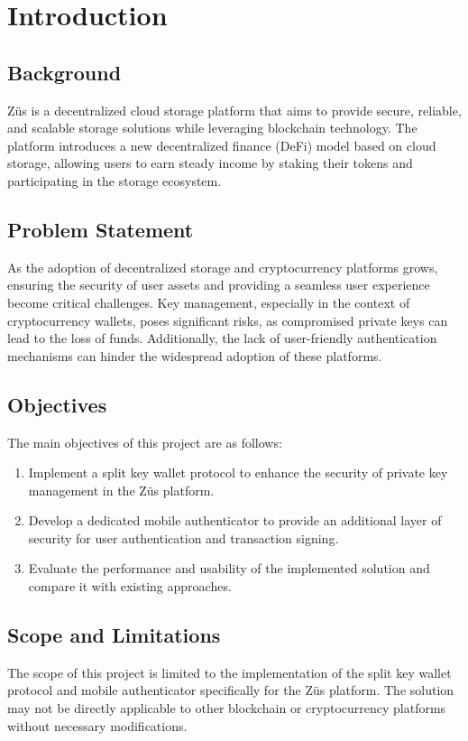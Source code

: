 \chapter{Introduction}

\section{Background}
Züs is a decentralized cloud storage platform that aims to provide secure, reliable, and scalable storage solutions while leveraging blockchain technology. The platform introduces a new decentralized finance (DeFi) model based on cloud storage, allowing users to earn steady income by staking their tokens and participating in the storage ecosystem.

\section{Problem Statement}
As the adoption of decentralized storage and cryptocurrency platforms grows, ensuring the security of user assets and providing a seamless user experience become critical challenges. Key management, especially in the context of cryptocurrency wallets, poses significant risks, as compromised private keys can lead to the loss of funds. Additionally, the lack of user-friendly authentication mechanisms can hinder the widespread adoption of these platforms.

\section{Objectives}
The main objectives of this project are as follows:
\begin{enumerate}
    \item Implement a split key wallet protocol to enhance the security of private key management in the Züs platform.
    \item Develop a dedicated mobile authenticator to provide an additional layer of security for user authentication and transaction signing.
    \item Evaluate the performance and usability of the implemented solution and compare it with existing approaches.
\end{enumerate}

\section{Scope and Limitations}
The scope of this project is limited to the implementation of the split key wallet protocol and mobile authenticator specifically for the Züs platform. The solution may not be directly applicable to other blockchain or cryptocurrency platforms without necessary modifications.

